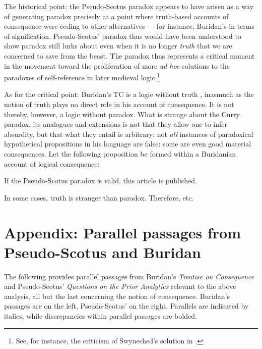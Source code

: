 \documentclass[]{article}
\begin{document}
The historical point: the Pseudo-Scotus paradox appears to have arisen as a way of generating paradox precisely at a point where truth-based accounts of consequence were ceding to other alternatives --- for instance, Buridan's in terms of signification. Pseudo-Scotus' paradox thus would have been understood to show paradox still lurks about even when it is no longer \textit{truth} that we are concerned to save from the beast. The paradox thus represents a critical moment in the movement toward the proliferation of more \textit{ad hoc} solutions to the paradoxes of self-reference in later medieval logic.\footnote{See, for instance, the criticism of Swyneshed's solution in \cite{Read2016}.}

As for the critical point: Buridan's TC is a logic without truth \cite{Klima2008}, inasmuch as the notion of truth plays no direct role in his account of consequence. It is not thereby, however, a logic without paradox. What is strange about the Curry paradox, its analogues and extensions is not that they allow one to infer absurdity, but that what they entail is arbitrary: not \textit{all} instances of paradoxical hypothetical propositions in his language are false: some are even good material consequences.  Let the following proposition be formed within a Buridanian account of logical consequence:

\begin{center}
If the Pseudo-Scotus paradox is valid, this article is published.
\end{center}

In some cases, truth is stranger than paradox. Therefore, etc.



\section{Appendix: Parallel passages from Pseudo-Scotus and Buridan}
The following provides parallel passages from Buridan's \textit{Treatise on Consequence} and Pseudo-Scotus' \textit{Questions on the Prior Analytics} relevant to the above analysis, all but the last concerning the notion of consequence. Buridan's passages are on the left, Pseudo-Scotus' on the right. Parallels are indicated by italics, while discrepancies within parallel passages are bolded.
\end{document}
